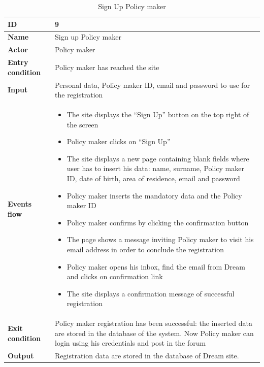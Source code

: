 \begin{longtable}{p{} | p{}}
\caption{Sign Up Policy maker}
        \label{tab:signup_policy_maker}\\
        \hline
        \textbf{ID} & 9\\
        \hline
        \textbf{Name}  &  Sign up Policy maker\\
        \hline
        \textbf{Actor}  &  Policy maker\\
        \hline
        \textbf{Entry condition}  &  Policy maker has reached the site\\
        \hline
        \textbf{Input}  & Personal data, Policy maker ID, email and password to use for the registration\\ 
        \hline
        \textbf{Events flow} & 
        \begin{itemize}
                \item The site displays the “Sign Up” button on the top right of the screen
                \item Policy maker clicks on “Sign Up”
                \item The site displays a new page containing blank fields where user has to insert his data: name, surname, Policy maker ID, date of birth, area of residence, email and password
                \item Policy maker inserts the mandatory data and the Policy maker ID
                \item Policy maker confirms by clicking the confirmation button
                \item The page shows a message inviting Policy maker to visit his email address in order to conclude the registration
                \item Policy maker opens his inbox, find the email from Dream and clicks on confirmation link
                \item The site displays a confirmation message of successful registration
                 \end{itemize}
                 \\
        \hline
        \textbf{Exit condition} & Policy maker registration has been successful: the inserted data are stored in the database of the system. Now Policy maker can login using his credentials and post in the forum\\
        \hline
        \textbf{Output} & Registration data are stored in the database of Dream site.\\
        \hline

\end{longtable}
